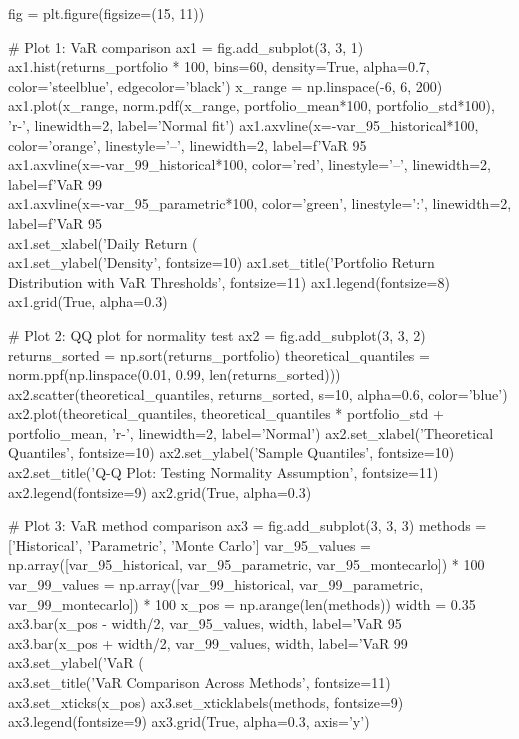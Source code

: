 \documentclass[11pt,a4paper]{article}
\begin{document}
\begin{pycode}
fig = plt.figure(figsize=(15, 11))

# Plot 1: VaR comparison
ax1 = fig.add_subplot(3, 3, 1)
ax1.hist(returns_portfolio * 100, bins=60, density=True, alpha=0.7, color='steelblue', edgecolor='black')
x_range = np.linspace(-6, 6, 200)
ax1.plot(x_range, norm.pdf(x_range, portfolio_mean*100, portfolio_std*100), 'r-', linewidth=2, label='Normal fit')
ax1.axvline(x=-var_95_historical*100, color='orange', linestyle='--', linewidth=2, label=f'VaR 95\\%
ax1.axvline(x=-var_99_historical*100, color='red', linestyle='--', linewidth=2, label=f'VaR 99\\%
ax1.axvline(x=-var_95_parametric*100, color='green', linestyle=':', linewidth=2, label=f'VaR 95\\%
ax1.set_xlabel('Daily Return (\\%
ax1.set_ylabel('Density', fontsize=10)
ax1.set_title('Portfolio Return Distribution with VaR Thresholds', fontsize=11)
ax1.legend(fontsize=8)
ax1.grid(True, alpha=0.3)

# Plot 2: QQ plot for normality test
ax2 = fig.add_subplot(3, 3, 2)
returns_sorted = np.sort(returns_portfolio)
theoretical_quantiles = norm.ppf(np.linspace(0.01, 0.99, len(returns_sorted)))
ax2.scatter(theoretical_quantiles, returns_sorted, s=10, alpha=0.6, color='blue')
ax2.plot(theoretical_quantiles, theoretical_quantiles * portfolio_std + portfolio_mean, 'r-', linewidth=2, label='Normal')
ax2.set_xlabel('Theoretical Quantiles', fontsize=10)
ax2.set_ylabel('Sample Quantiles', fontsize=10)
ax2.set_title('Q-Q Plot: Testing Normality Assumption', fontsize=11)
ax2.legend(fontsize=9)
ax2.grid(True, alpha=0.3)

# Plot 3: VaR method comparison
ax3 = fig.add_subplot(3, 3, 3)
methods = ['Historical', 'Parametric', 'Monte Carlo']
var_95_values = np.array([var_95_historical, var_95_parametric, var_95_montecarlo]) * 100
var_99_values = np.array([var_99_historical, var_99_parametric, var_99_montecarlo]) * 100
x_pos = np.arange(len(methods))
width = 0.35
ax3.bar(x_pos - width/2, var_95_values, width, label='VaR 95\\%
ax3.bar(x_pos + width/2, var_99_values, width, label='VaR 99\\%
ax3.set_ylabel('VaR (\\%
ax3.set_title('VaR Comparison Across Methods', fontsize=11)
ax3.set_xticks(x_pos)
ax3.set_xticklabels(methods, fontsize=9)
ax3.legend(fontsize=9)
ax3.grid(True, alpha=0.3, axis='y')


\end{pycode}
\end{document}
